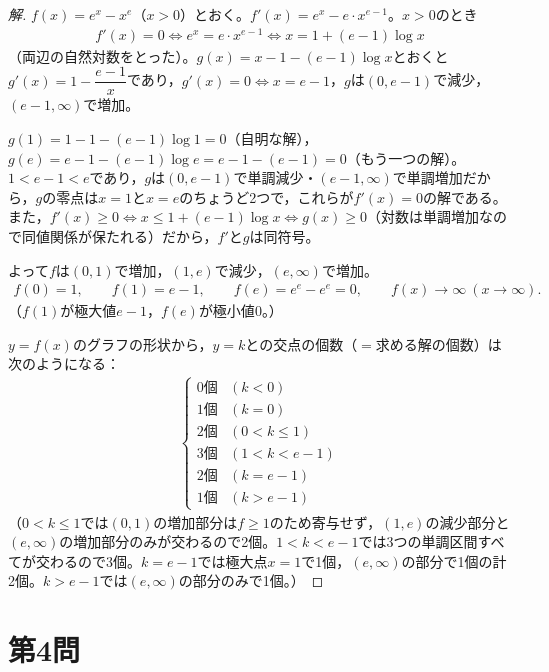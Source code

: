 \documentclass[../main.tex]{subfiles}
\begin{document}
\begin{proof}[解]
  $f(x)=e^x-x^e$（$x>0$）とおく。$f'(x)=e^x-e\cdot x^{e-1}$。$x>0$のとき
  \begin{align*}
    f'(x)=0\iff e^x=e\cdot x^{e-1}\iff x=1+(e-1)\log x\tag{①}
  \end{align*}
  （両辺の自然対数をとった）。$g(x)=x-1-(e-1)\log x$とおくと$g'(x)=1-\dfrac{e-1}x$であり，$g'(x)=0\iff x=e-1$，$g$は$(0,e-1)$で減少，$(e-1,\infty)$で増加。

  $g(1)=1-1-(e-1)\log1=0$（自明な解），$g(e)=e-1-(e-1)\log e=e-1-(e-1)=0$（もう一つの解）。$1<e-1<e$であり，$g$は$(0,e-1)$で単調減少・$(e-1,\infty)$で単調増加だから，$g$の零点は$x=1$と$x=e$のちょうど2つで，これらが$f'(x)=0$の解である。また，$f'(x)\ge0\iff x\le1+(e-1)\log x\iff g(x)\ge0$（対数は単調増加なので同値関係が保たれる）だから，$f'$と$g$は同符号。

  よって$f$は$(0,1)$で増加，$(1,e)$で減少，$(e,\infty)$で増加。
  \begin{align*}
    f(0)=1,\qquad f(1)=e-1,\qquad f(e)=e^e-e^e=0,\qquad f(x)\to\infty\ (x\to\infty).
  \end{align*}
  （$f(1)$が極大値$e-1$，$f(e)$が極小値$0$。）

  $y=f(x)$のグラフの形状から，$y=k$との交点の個数（$=$求める解の個数）は次のようになる：
  \begin{align*}
    \begin{cases}
      0\text{個} & (k<0)\\
      1\text{個} & (k=0)\\
      2\text{個} & (0<k\le1)\\
      3\text{個} & (1<k<e-1)\\
      2\text{個} & (k=e-1)\\
      1\text{個} & (k>e-1)
    \end{cases}
  \end{align*}
  （$0<k\le1$では$(0,1)$の増加部分は$f\ge1$のため寄与せず，$(1,e)$の減少部分と$(e,\infty)$の増加部分のみが交わるので2個。$1<k<e-1$では3つの単調区間すべてが交わるので3個。$k=e-1$では極大点$x=1$で1個，$(e,\infty)$の部分で1個の計2個。$k>e-1$では$(e,\infty)$の部分のみで1個。）
\end{proof}

\newpage

\section*{第4問}
\end{document}
